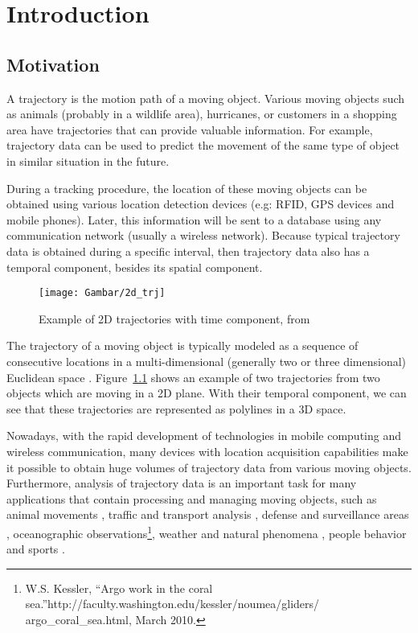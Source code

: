 \chapter{Introduction}
\label{chap:intro}

\section{Motivation}
\label{sec:motivation}

A trajectory is the motion path of a moving object.
Various moving objects such as animals (probably in a wildlife area), hurricanes, or customers in a shopping area have trajectories that can provide valuable information.
For example, trajectory data can be used to predict the movement of the same type of object in similar situation in the future. 

During a tracking procedure, the location of these moving objects can be obtained using various location detection devices (e.g: RFID, GPS devices and mobile phones).
Later, this information will be sent to a database using any communication network (usually a wireless network).
Because typical trajectory data is obtained during a specific interval, then trajectory data also has a temporal component, besides its spatial component.

\begin{figure}
\centering
\texttt{[image: Gambar/2d\_trj]}
\caption[Example of 2D trajectories with time component, from \cite{Vlachos:2002}]{Example of 2D trajectories with time component, from \cite{Vlachos:2002}} 
\label{fig:2d_trj}
\end{figure}

The trajectory of a moving object is typically modeled as a sequence of consecutive locations in a multi-dimensional (generally two or three dimensional) Euclidean space \cite{Vlachos:2002}.
Figure~\ref{fig:2d_trj} shows an example of two trajectories from two objects which are moving in a 2D plane.
With their temporal component, we can see that these trajectories are represented as polylines in a 3D space.

Nowadays, with the rapid development of technologies in mobile computing and wireless communication, many devices with location acquisition capabilities make it possible to obtain huge volumes of trajectory data from various moving objects.
Furthermore, analysis of trajectory data is an important task for many applications that contain processing and managing moving objects, such as animal movements \cite{Calenge:2009,Nams:2004,Herb:2010,Brillinger:2001}, traffic and transport analysis \cite{Yunyao:1998}, defense and surveillance areas \cite{Ng:2001}, oceanographic observations\footnote{W.S. Kessler, ``Argo work in the coral sea.''http://faculty.washington.edu/kessler/noumea/gliders/\\argo\_coral\_sea.html, March 2010.}, weather and natural phenomena \cite{Hubert:1957}, people behavior \cite{Fuentes:2001} and sports \cite{Brillinger:2007,Iwase:2002}.

